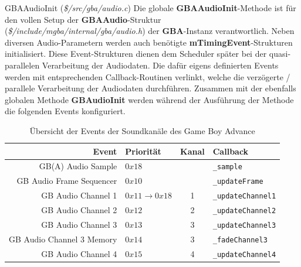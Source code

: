 \documentclass[11pt,a4paper]{scrartcl}
\begin{document}
\vspace{5mm}
\large GBAAudioInit \normalsize(\textit{\$/src/gba/audio.c})
\vspace{2mm}\newline
Die globale \textbf{GBAAudioInit}-Methode ist f\"ur den vollen Setup der \textbf{GBAAudio}-Struktur (\textit{\$/include/mgba/internal/gba/audio.h}) der \textbf{GBA}-Instanz verantwortlich. Neben diversen Audio-Parametern werden auch ben\"otigte \textbf{mTimingEvent}-Strukturen initialisiert. Diese Event-Strukturen dienen dem Scheduler sp\"ater bei der quasi-parallelen Verarbeitung der Audiodaten. Die daf\"ur eigens definierten Events werden mit entsprechenden Callback-Routinen verlinkt, welche die verz\"ogerte / parallele Verarbeitung der Audiodaten durchf\"uhren. Zusammen mit der ebenfalls globalen Methode \textbf{GBAudioInit} werden w\"ahrend der Ausf\"uhrung der Methode die folgenden Events konfiguriert.

\begin{table}[h]
    \centering
    \begin{tabular}{ r | p{3cm} | c | p{7cm} }
        \textbf{Event} & \textbf{Priorit\"at} & \textbf{Kanal} & \textbf{Callback} \\
        \hline
        GB(A) Audio Sample & $0x18$ & & \verb|_sample| \\
        \hline
        GB  Audio Frame Sequencer & $0x10$ & & \verb|_updateFrame| \\
        \hline
        GB Audio Channel 1 & $0x11 \rightarrow 0x18$ & 1 & \verb|_updateChannel1|  \\
        \hline
        GB Audio Channel 2 & $0x12$ & 2 & \verb|_updateChannel2| \\
        \hline
        GB Audio Channel 3 & $0x13$ & 3 & \verb|_updateChannel3| \\
        \hline
        GB Audio Channel 3 Memory & $0x14$ & 3 & \verb|_fadeChannel3| \\
        \hline
        GB Audio Channel 4 & $0x15$ & 4 & \verb|_updateChannel4| \\
    \end{tabular}
    \caption{\"Ubersicht der Events der Soundkan\"ale des Game Boy Advance}
    \label{table:SoundEvents}
\end{table}
\end{document}

